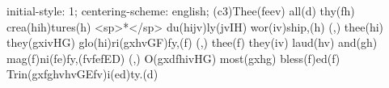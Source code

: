 initial-style: 1;
centering-scheme: english;
(c3)Thee(feev) all(d) thy(fh) crea(hih)tures(h) <sp>*</sp> du(hijv)ly(jvIH) wor(iv)ship,(h) (,) thee(hi) they(gxivHG) glo(hi)ri(gxhvGF)fy,(f) (,) thee(f) they(iv) laud(hv) and(gh) mag(f)ni(fe)fy,(fvfefED) (,) O(gxdfhivHG) most(gxhg) bless(f)ed(f) Trin(gxfghvhvGEfv)i(ed)ty.(d)
